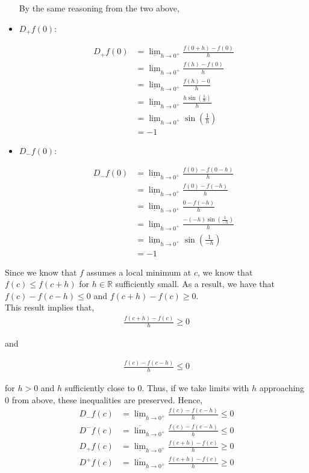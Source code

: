 \documentclass[12pt]{article}
\newenvironment{problem}[2][Problem]{\begin{trivlist}
\item[\hskip \labelsep {\bfseries #1}\hskip \labelsep {\bfseries #2.}]}{\end{trivlist}}
\begin{document}
\begin{itemize}
By the same reasoning from the two above,

\item $D_+f(0)$:

\begin{align*}
D_+f(0) &= \underline{\lim}_{h \to 0^+} \frac{f(0+h) - f(0)}{h}\\
&= \underline{\lim}_{h \to 0^+} \frac{f(h) - f(0)}{h}\\
&= \underline{\lim}_{h \to 0^+} \frac{f(h) - 0}{h}\\
&= \underline{\lim}_{h \to 0^+} \frac{h\sin(\frac{1}{h})}{h}\\
&= \underline{\lim}_{h \to 0^+} \sin\left(\frac{1}{h}\right)\\
&= -1
\end{align*}

\item $D_-f(0)$:

\begin{align*}
D_-f(0) &= \underline{\lim}_{h \to 0^+} \frac{f(0) - f(0-h)}{h}\\
&= \underline{\lim}_{h \to 0^+} \frac{f(0) - f(-h)}{h}\\
&= \underline{\lim}_{h \to 0^+} \frac{0 - f(-h)}{h}\\
&= \underline{\lim}_{h \to 0^+} \frac{-(-h)\sin(\frac{1}{-h})}{h}\\
&= \underline{\lim}_{h \to 0^+} \sin\left(\frac{1}{-h}\right)\\
&= -1
\end{align*}
\end{itemize}

\newpage
\begin{problem}{2}
\end{problem}

Since we know that $f$ assumes a local minimum at $c$, we know that $f(c) \leq f(c+h)$ for $h \in \mathbb{R}$ sufficiently small. As a result, we have that $f(c) - f(c-h) \leq 0$ and $f(c+h) - f(c) \geq 0$.\\

This result implies that,
\begin{align*}
\frac{f(c+h) - f(c)}{h} \geq 0
\end{align*}

and

\begin{align*}
\frac{f(c) - f(c-h)}{h} \leq 0
\end{align*}

for $h > 0$ and $h$ sufficiently close to $0$. Thus, if we take limits with $h$ approaching $0$ from above, these inequalities are preserved. Hence,
\begin{align*}
D_-f(c) &= \underline{\lim}_{h \to 0^+} \frac{f(c) - f(c-h)}{h} \leq 0\\
D^-f(c) &= \overline{\lim}_{h \to 0^+} \frac{f(c) - f(c-h)}{h} \leq 0\\
D_+f(c) &= \underline{\lim}_{h \to 0^+} \frac{f(c+h) - f(c)}{h} \geq 0\\
D^+f(c) &= \overline{\lim}_{h \to 0^+} \frac{f(c+h) - f(c)}{h} \geq 0
\end{align*}
\end{document}
